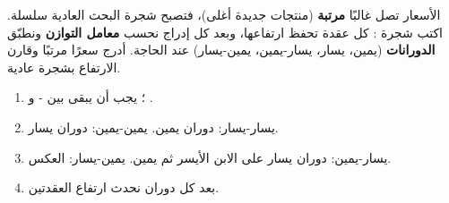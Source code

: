 \clearpage
{}

\begin{statement}
الأسعار تصل غالبًا \textbf{مرتبة} (منتجات جديدة أغلى)، فتصبح شجرة البحث العادية سلسلة. اكتب شجرة \textbf{}: كل عقدة تحفظ ارتفاعها، وبعد كل إدراج نحسب \textbf{معامل التوازن} ونطبّق \textbf{الدورانات} (يمين، يسار، يسار-يمين، يمين-يسار) عند الحاجة. أدرج  سعرًا مرتبًا وقارن الارتفاع بشجرة عادية.
\end{statement}
\begin{stepsbox}\begin{enumerate}
\item {}؛ يجب أن يبقى بين - و .
\item يسار-يسار: دوران يمين. يمين-يمين: دوران يسار.
\item يسار-يمين: دوران يسار على الابن الأيسر ثم يمين. يمين-يسار: العكس.
\item بعد كل دوران نحدث ارتفاع العقدتين.
\end{enumerate}\end{stepsbox}
